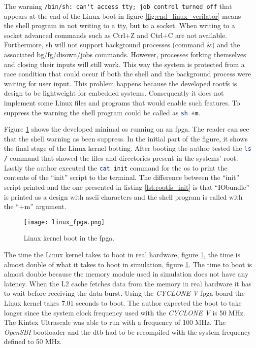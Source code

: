 The warning \lstinline{/bin/sh: can't access tty; job control turned off} that appears at the end of the Linux boot in figure \ref{fig:end_linux_verilator} means the shell program in not writing to a tty, but to a socket. When writing to a socket advanced commands such as Ctrl+Z and Ctrl+C are not available. Furthermore, sh will not support background processes (command \&) and the associated bg/fg/disown/jobs commands. However, processes forking themselves and closing their inputs will still work. This way the system is protected from a race condition that could occur if both the shell and the background process were waiting for user input. This problem happens because the developed \acrshort{rootfs} is design to be lightweight for embedded systems. Consequently it does not implement some Linux files and programs that would enable such features. To suppress the warning the shell program could be called as \lstinline[language=sh]{sh +m}.

Figure \ref{fig:linux_fpga} shows the developed minimal \acrshort{os} running on an \acrshort{fpga}. The reader can see that the shell warning as been suppress. In the initial part of the figure, it shows the final stage of the Linux kernel botting. After booting the author tested the \lstinline[language=sh]{ls /} command that showed the files and directories present in the systems' root. Lastly the author executed the \lstinline[language=sh]{cat init} command for the \acrshort{os} to print the contents of the \enquote{init} script to the terminal. The difference between the \enquote{init} script printed and the one presented in listing \ref{lst:rootfs_init} is that \enquote{IObundle} is printed as a design with \acrshort{ascii} characters and the shell program is called with the \enquote{+m} argument.

\begin{figure}[!ht]
    \centering
    \texttt{[image: linux\_fpga.png]}
    \caption{Linux kernel boot in the \acrshort{fpga}.}
    \label{fig:linux_fpga}
\end{figure}

The time the Linux kernel takes to boot in real hardware, figure \ref{fig:linux_fpga}, the time is almost double of what it takes to boot in simulation, figure \ref{fig:linux_fpga}. The time to boot is almost double because the memory module used in simulation does not have any latency. When the L2 cache fetches data from the memory in real hardware it has to wait before receiving the data burst. Using the \textit{CYCLONE V} \acrshort{fpga} board the Linux kernel takes 7.01 seconds to boot. The author expected the boot to take longer since the system clock frequency used with the \textit{CYCLONE V} is 50 MHz. The Kintex Ultrascale was able to run with a frequency of 100 MHz. The \textit{OpenSBI} bootloader and the \acrlong{dtb} had to be recompiled with the system frequency defined to 50 MHz.

